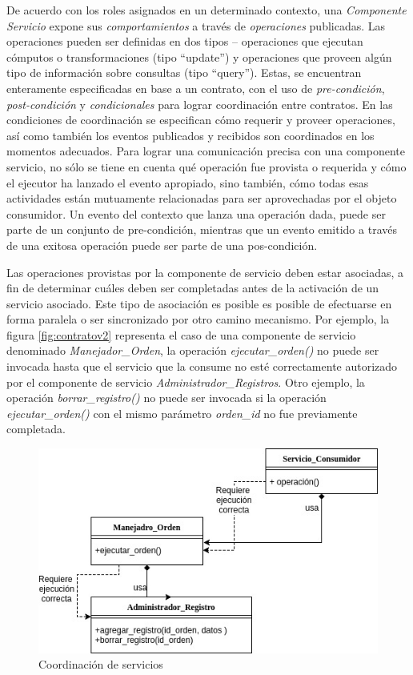{\begin{itemize}
De acuerdo con los roles asignados en un determinado contexto, una
\textit{Componente Servicio} expone sus  \textit{comportamientos} a través de \textit{operaciones} publicadas. Las operaciones pueden ser definidas en dos tipos – operaciones que ejecutan cómputos o
transformaciones (tipo “update”) y operaciones que proveen algún tipo de información
sobre consultas (tipo “query”). Estas, se encuentran enteramente especificadas en base
a un contrato, con el uso de \textit{pre-condición}, \textit{post-condición} y \textit{condicionales} para lograr coordinación entre contratos. En las condiciones de coordinación se especifican cómo
requerir y proveer operaciones, así como también los eventos publicados y recibidos son coordinados en los momentos adecuados. Para lograr una comunicación precisa con una componente servicio, no sólo se tiene en cuenta qué operación fue provista o requerida y cómo el ejecutor ha lanzado el evento apropiado, sino también, cómo todas esas actividades están mutuamente relacionadas para ser aprovechadas por el objeto consumidor. Un evento del contexto que lanza una operación dada, puede ser parte de un conjunto de pre-condición, mientras que un evento emitido a través de una exitosa operación puede ser parte de una pos-condición.


Las operaciones provistas por la componente de servicio deben estar asociadas, a fin de determinar cuáles deben ser completadas antes de la activación de un servicio asociado. Este tipo de asociación es posible es posible de efectuarse en forma paralela o ser sincronizado por otro camino mecanismo. Por ejemplo, la figura \ref{fig:contratov2} representa el caso de una componente de servicio denominado \textit{Manejador\_Orden}, la operación \textit{ejecutar\_orden()} no puede ser invocada hasta que el servicio que la consume no esté correctamente autorizado por el componente de servicio \textit{Administrador\_Registros}. Otro ejemplo, la operación \textit{borrar\_registro()} no puede ser invocada si la operación \textit{ejecutar\_orden()} con el mismo parámetro \textit{orden\_id} no fue previamente completada.




\begin{figure}
\begin{center}
 \includegraphics [width=3.5 in,totalheight=2 in]{Ch4/servicios_coordinados}
\end{center}
\caption{Coordinación de servicios}
\label{fig:servicios_coordinados}
\end{figure}






\end{itemize}}
